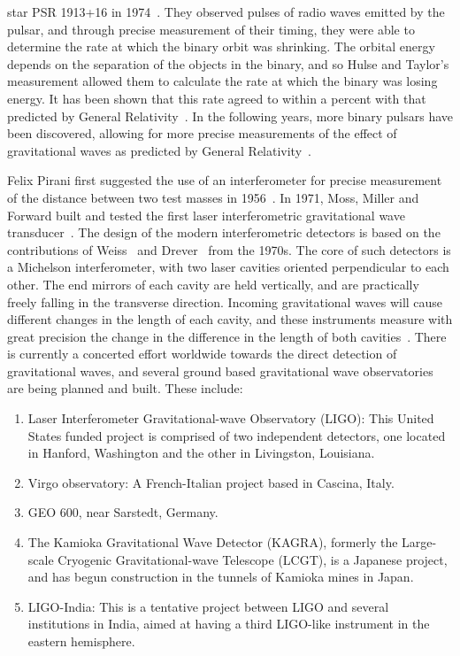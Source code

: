 star PSR 1913+16 in 1974~\cite{hulse}. They observed pulses of radio waves
emitted by the pulsar, and through precise measurement of their timing,
they were able to determine the rate at which the binary orbit was shrinking.
The orbital energy depends on the separation of the objects in 
the binary, and so Hulse and Taylor's
measurement allowed them to calculate the rate at which the binary 
was losing energy. It has been shown that this rate agreed to within a percent
with that predicted by General Relativity~\cite{Weisberg:1981mt,Taylor:1989}.
In the following years, more binary pulsars
have been discovered, allowing for more precise measurements of the effect
of gravitational waves as predicted by General Relativity~\cite{Burgay:2003jj}.



Felix Pirani first suggested the use of an interferometer for precise
measurement of the distance between two test masses in 1956~\cite{Pirani:1956}.
In 1971, Moss, Miller and Forward built and tested the first laser
interferometric gravitational wave transducer~\cite{Forward:1971}. The design
of the modern interferometric detectors is based on the contributions 
of Weiss~\cite{Weiss:1972} and Drever~\cite{Drever:1980} from the 1970s. The
core of such detectors is a Michelson interferometer, with two laser 
cavities oriented perpendicular to each other. The end mirrors of each 
cavity are held vertically, and are practically freely falling in the 
transverse direction. Incoming gravitational waves will cause different 
changes in the length of each cavity, and these instruments measure with 
great precision the change in the difference in the length of both 
cavities~\cite{Saulson:1995zi}. 
%
There is currently a concerted effort worldwide towards the direct detection 
of gravitational waves, and several ground based gravitational wave observatories 
are being planned and built. These include:
%
\begin{enumerate}
 \item Laser Interferometer Gravitational-wave Observatory (LIGO): This
 United States funded project is comprised of two independent detectors, one 
 located in Hanford, Washington and the other in Livingston, Louisiana. 
 \item Virgo observatory: A French-Italian project based in Cascina, Italy.
 \item GEO 600, near Sarstedt, Germany.
 \item The Kamioka Gravitational Wave Detector (KAGRA), formerly the Large-scale
 Cryogenic Gravitational-wave Telescope (LCGT), is a Japanese project, and has
 begun construction in the tunnels of Kamioka mines in Japan.  
 \item LIGO-India: This is a tentative project between LIGO and several 
 institutions in India, aimed at having a third LIGO-like instrument in the 
 eastern hemisphere.
\end{enumerate}
